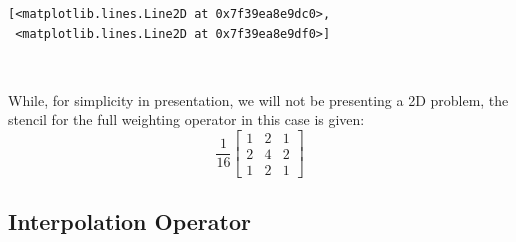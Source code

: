 \documentclass[11pt]{article}
\makeatletter
\newcommand{\boxspacing}{\kern\kvtcb@left@rule\kern\kvtcb@boxsep}
\newcommand{\prompt}[4]{
        \ttfamily\llap{{\color{#2}[#3]:\hspace{3pt}#4}}\vspace{-\baselineskip}
    }
\makeatother
\begin{document}
            \begin{tcolorbox}[breakable, size=fbox, boxrule=.5pt, pad at break*=1mm, opacityfill=0]
\prompt{Out}{outcolor}{9}{\boxspacing}
\begin{Verbatim}[commandchars=\\\{\}]
[<matplotlib.lines.Line2D at 0x7f39ea8e9dc0>,
 <matplotlib.lines.Line2D at 0x7f39ea8e9df0>]
\end{Verbatim}
\end{tcolorbox}
        
    \begin{center}
    \end{center}
    { \hspace*{\fill} \\}
    
    While, for simplicity in presentation, we will not be presenting a 2D
problem, the stencil for the full weighting operator in this case is
given: \[
\frac{1}{16}
\begin{bmatrix}
1 & 2 & 1 \\
2 & 4 & 2 \\
1 & 2 & 1
\end{bmatrix}
\]

    \hypertarget{interpolation-operator}{%
\subsection{Interpolation Operator}\label{interpolation-operator}}
\end{document}
